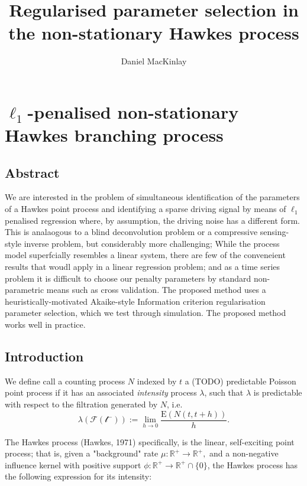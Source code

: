 \documentclass[11pt]{article}
\title{Regularised parameter selection in the non-stationary Hawkes process}
\author{Daniel MacKinlay}
\begin{document}
    
    
    \maketitle
    
    

    
    \section{$\ell_1$-penalised non-stationary Hawkes branching
process}\label{ellux5f1-penalised-non-stationary-hawkes-branching-process}





    \subsection{Abstract}\label{abstract}

We are interested in the problem of simultaneous identification of the
parameters of a Hawkes point process and identifying a sparse driving
signal by means of $\ell_1$ penalised regression where, by assumption,
the driving noise has a different form. This is analaogous to a blind
deconvolution problem or a compressive sensing-style inverse problem,
but considerably more challenging; While the process model superfcially
resembles a linear system, there are few of the conveneient results that
woudl apply in a linear regression problem; and as a time series problem
it is difficult to choose our penalty parameters by standard
non-parametric means such as cross validation. The proposed method uses
a heuristically-motivated Akaike-style Information criterion
regularisation parameter selection, which we test through simulation.
The proposed method works well in practice.

    \subsection{Introduction}\label{introduction}

We define call a counting process $N$ indexed by $t$ a (TODO)
predictable Poisson point process if it has an associated
\emph{intensity} process $\lambda$, such that $\lambda$ is predictable
with respect to the filtration generated by $N$, i.e.
\[\lambda(\mathcal{F(t^-)}):=\lim_{h\to 0} \frac{\mathrm E\left(N(t,t+h)\right)}{h}.\]

The Hawkes process (Hawkes, 1971) specifically, is the linear,
self-exciting point process; that is, given a "background" rate
$\mu:\mathbb{R}^+\rightarrow\mathbb{R}^+,$ and a non-negative influence
kernel with positive support
$\phi:\mathbb{R}^+\rightarrow\mathbb{R}^+\cap\{0\}$, the Hawkes process
has the following expression for its intensity:
\end{document}
